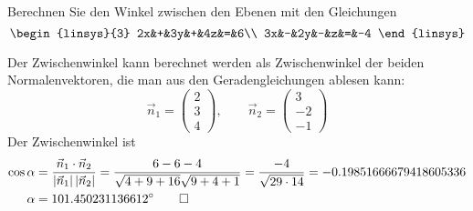 Berechnen Sie den Winkel zwischen den Ebenen mit den Gleichungen
\[
\begin{linsys}{3}
2x&+&3y&+&4z&=&6\\
3x&-&2y&-&z&=&-4
\end{linsys}
\]


\begin{loesung}
Der Zwischenwinkel kann berechnet werden als Zwischenwinkel der
beiden Normalenvektoren, die man aus den Geradengleichungen
ablesen kann:
$$
\vec n_1=\begin{pmatrix}2\\3\\4\end{pmatrix},\qquad
\vec n_2=\begin{pmatrix}3\\-2\\-1\end{pmatrix}
$$
Der Zwischenwinkel ist
\begin{align*}
\cos\alpha&=\frac{\vec n_1\cdot\vec n_2}{|\vec n_1|\,|\vec n_2|}=\frac{6-6-4}{\sqrt{4+9+16}\sqrt{9+4+1}}
=\frac{-4}{\sqrt{29\cdot14}}=-0.19851666679418605336
\\
\alpha&=101.450231136612^\circ
\qedhere
\end{align*}
\end{loesung}

